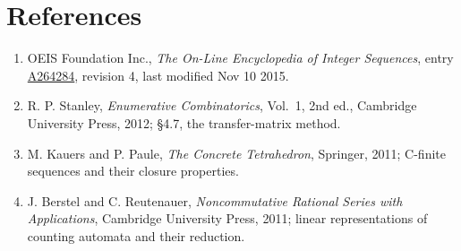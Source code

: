 \documentclass[11pt]{article}
\theoremstyle{definition}
\begin{document}
\section{References}

\begin{enumerate}

\item OEIS Foundation Inc., \emph{The On-Line Encyclopedia of Integer Sequences}, entry \href{https://oeis.org/A264284}{A264284}, revision 4, last modified Nov 10 2015.

\item R. P. Stanley, \emph{Enumerative Combinatorics}, Vol.~1, 2nd ed., Cambridge University Press, 2012; \S4.7, the transfer-matrix method.

\item M. Kauers and P. Paule, \emph{The Concrete Tetrahedron}, Springer, 2011; C-finite sequences and their closure properties.

\item J. Berstel and C. Reutenauer, \emph{Noncommutative Rational Series with Applications}, Cambridge University Press, 2011; linear representations of counting automata and their reduction.

\end{enumerate}
\end{document}
